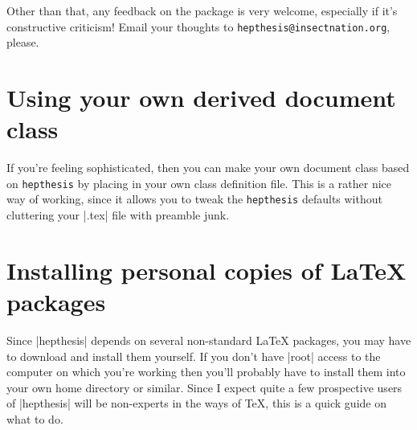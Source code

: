 \documentclass[12pt]{article}
\newcommand{\hepthesis}{\texttt{hepthesis}\xspace}
\newenvironment{snippet}{\Verbatim}{\endVerbatim}
\begin{document}
Other than that, any feedback on the package is very welcome, especially if it's
constructive criticism! Email your thoughts to
\texttt{hepthesis@insectnation.org}, please.


\appendix

\section{Using your own derived document class}
\label{app:DerivedClass}
If you're feeling sophisticated, then you can make your own document class based on 
\hepthesis by placing
%
\begin{snippet}
\end{snippet}
%
in your own class definition file. This is a rather nice way of working, since
it allows you to tweak the \hepthesis defaults without cluttering your
|.tex| file with preamble junk.


\section{Installing personal copies of \LaTeX{} packages}
\label{app:InstallingPackages}
Since |hepthesis| depends on several non-standard \LaTeX{} packages, you may have to
download and install them yourself. If you don't have |root| access to the computer
on which you're working then you'll probably have to install them into your own home
directory or similar. Since I expect quite a few prospective users of |hepthesis| will
be non-experts in the ways of \TeX{}, this is a quick guide on what to do.
\end{document}
